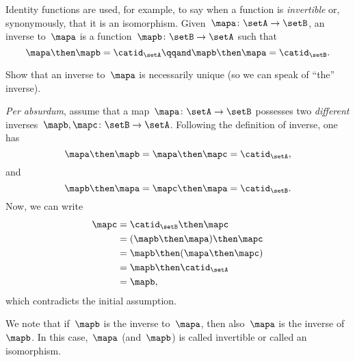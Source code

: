 Identity functions are used, for example, to say when a function is \emph{invertible} or, synonymously, that it is an isomorphism.
Given~$\mapa \colon \setA \to \setB$, an inverse to~$\mapa$ is a function~$\mapb \colon \setB \to \setA$ such that
\begin{equation}
    \label{eq:isomorphism-equations}
    \mapa \then \mapb = \catid_\setA
    \qqand
    \mapb \then \mapa = \catid_\setB.
\end{equation}
%

\begin{exercise}
    Show that an inverse to~$\mapa$ is necessarily unique (so we can speak of ``the'' inverse).
\end{exercise}

\begin{solution}
    \emph{Per absurdum}, assume that a map~$\mapa\colon \setA \to \setB$ possesses two \emph{different} inverses~$\mapb,\mapc\colon \setB\to \setA$.
    Following the definition of inverse, one has
    \begin{equation*}
        \mapa \then \mapb=\mapa \then \mapc=\catid_\setA,
    \end{equation*}
    and
    \begin{equation*}
        \mapb \then \mapa=\mapc \then \mapa=\catid_\setB.
    \end{equation*}
    Now, we can write
    \begin{equation*}
        \begin{aligned}
            \mapc & =\catid_\setB \then \mapc \\
                  & =(\mapb \then \mapa)\then \mapc \\
                  & =\mapb\then (\mapa \then \mapc) \\
                  & =\mapb \then \catid_\setA \\
                  & =\mapb,
        \end{aligned}
    \end{equation*}
    which contradicts the initial assumption.
\end{solution}
We note that if~$\mapb$ is the inverse to~$\mapa$, then also~$\mapa$ is the inverse of~$\mapb$.
In this case,~$\mapa$ (and~$\mapb$) is called invertible or called an isomorphism.


